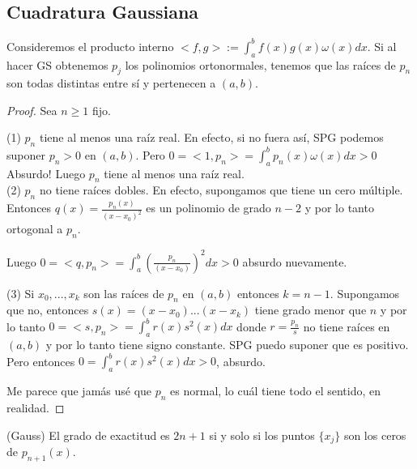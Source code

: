 \documentclass[10pt,a4paper,final]{report}
\begin{document}
\subsection{Cuadratura Gaussiana}

\begin{theorem}
Consideremos el producto interno $<f,g>:= \int_a^b f(x) g(x) \omega(x) dx$. Si al hacer GS obtenemos ${p_j}$ los polinomios ortonormales, tenemos que las raíces de $p_n$ son todas distintas entre sí y pertenecen a $(a,b)$.
\end{theorem}

\begin{proof}
	Sea $n\geq 1$ fijo.
	
	(1) $p_n$ tiene al menos una raíz real. En efecto, si no fuera así, SPG podemos suponer $p_n >0$ en $(a,b)$. Pero $0=<1,p_n> = \int_a^b p_n(x) \omega(x) dx > 0$ Absurdo! Luego $p_n$ tiene al menos una raíz real.\\
	
	(2) $p_n$ no tiene raíces dobles. En efecto, supongamos que tiene un cero múltiple. Entonces $q(x) = \frac{p_n(x)}{(x-x_0)^2}$ es un polinomio de grado $n-2$ y por lo tanto ortogonal a $p_n$.
	
	Luego $0=<q,p_n> = \int_a^b (\frac{p_n}{(x-x_0)})^2 dx > 0$ absurdo nuevamente.
	
	(3) Si $x_0,...,x_k$ son las raíces de $p_n$ en $(a,b)$ entonces $k=n-1$. Supongamos que no, entonces $s(x) = (x-x_0)...(x-x_k)$ tiene grado menor que $n$ y por lo tanto $0=<s,p_n> = \int_a^b r(x) s^2(x) dx$ donde $r = \frac{p_n}{s}$ no tiene raíces en $(a,b)$ y por lo tanto tiene signo constante. SPG puedo suponer que es positivo. Pero entonces $0 = \int_a^b r(x) s^2(x) dx > 0$, absurdo.
	
	Me parece que jamás usé que $p_n$ es normal, lo cuál tiene todo el sentido, en realidad.
\end{proof}

\begin{theorem} (Gauss) El grado de exactitud es $2n+1$ si y solo si los puntos $\{x_j\}$ son los ceros de $p_{n+1}(x)$.
\end{theorem}
\end{document}
